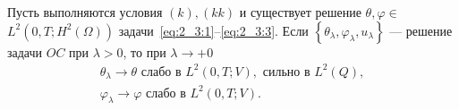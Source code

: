 \begin{frame}
    \begin{theorem}[2.8]
        \label{th:2_3:3}
        Пусть выполняются условия $(k), (kk)$ и существует решение
        $\theta, \varphi \in$ $L^{2}\left(0, T ; H^{2}(\Omega) \right)$
        задачи~\eqref{eq:2_3:1}--\eqref{eq:2_3:3}.
        Если $\left\{\theta_{\lambda}, \varphi_{\lambda}, u_{\lambda}\right\}$
        — решение задачи $OC$ при $\lambda>0$, то при $\lambda\rightarrow+0$
        \[
            \begin{gathered}
                \theta_{\lambda} \rightarrow \theta \text { слабо в } L^{2}(0, T ; V),
                \text { сильно в } L^{2}(Q), \\
                \varphi_{\lambda} \rightarrow \varphi \text { слабо в } L^{2}(0, T ; V).
            \end{gathered}
        \]
    \end{theorem}
\end{frame}

